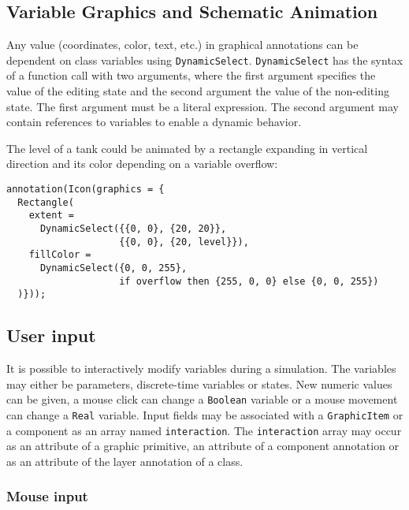 \subsection{Variable Graphics and Schematic Animation}\label{variable-graphics-and-schematic-animation}

Any value (coordinates, color, text, etc.) in graphical annotations can be dependent on class variables using \lstinline!DynamicSelect!.
\lstinline!DynamicSelect! has the syntax of a function call with two arguments, where the first argument specifies the value of the editing state and the second argument the value of the non-editing state.
The first argument must be a literal expression.
The second argument may contain references to variables to enable a dynamic behavior.

\begin{example}
The level of a tank could be animated by a rectangle expanding in vertical direction and its color depending on a variable overflow:
\begin{lstlisting}[language=modelica]
annotation(Icon(graphics = {
  Rectangle(
    extent =
      DynamicSelect({{0, 0}, {20, 20}},
                    {{0, 0}, {20, level}}),
    fillColor =
      DynamicSelect({0, 0, 255},
                    if overflow then {255, 0, 0} else {0, 0, 255})
  )}));
\end{lstlisting}
\end{example}

\subsection{User input}\label{user-input}

It is possible to interactively modify variables during a simulation.  The variables may either be parameters, discrete-time variables or states.  New numeric values can be given, a mouse click can change a \lstinline!Boolean! variable or a mouse movement can change a \lstinline!Real! variable.  Input fields may be associated with a \lstinline!GraphicItem! or a component as an array named \lstinline!interaction!.  The \lstinline!interaction! array may occur as an attribute of a graphic primitive, an attribute of a component annotation or as an attribute of the layer annotation of a class.

\subsubsection{Mouse input}\label{mouse-input}

